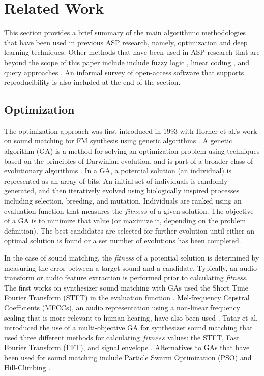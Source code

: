 \section{Related Work}\label{sec:2}
This section provides a brief summary of the main algorithmic methodologies that have been used in previous ASP research, namely, optimization and deep learning techniques. Other methods that have been used in ASP research that are beyond the scope of this paper include  include fuzzy logic \cite{mitchell2005frequency, hamadicharef2012intelligent}, linear coding \cite{mintz2007toward}, and query approaches \cite{mcartwright2014}. An  informal survey of open-access software that supports reproducibility is also included at the end of the section.

\subsection{Optimization}
The optimization approach was first introduced in 1993 with Horner et al.'s work on sound matching for FM synthesis using genetic algorithms \cite{horner1993machine}. A genetic algorithm (GA) is a method for solving an optimization problem using techniques based on the principles of Darwinian evolution, and is part of a broader class of evolutionary algorithms \cite{whitley1994genetic}. In a GA, a potential solution (an individual) is represented as an array of bits. An initial set of individuals is randomly generated, and then iteratively evolved using biologically inspired processes including selection, breeding, and mutation. Individuals are ranked using an evaluation function that measures the $fitness$ of a given solution. The objective of a GA is to minimize that value (or maximize it, depending on the problem definition). The best candidates are selected for further evolution until either an optimal solution is found or a set number of evolutions has been completed.

In the case of sound matching, the \textit{fitness} of a potential solution is determined by measuring the error between a target sound and a candidate. Typically, an audio transform or audio feature extraction is performed prior to calculating \textit{fitness}. The first works on synthesizer sound matching with GAs used the Short Time Fourier Transform (STFT) in the evaluation function \cite{horner1993machine, horner1995wavetable}. Mel-frequency Cepstral Coefficients (MFCCs), an audio representation using a non-linear frequency scaling that is more relevant to human hearing, have also been used \cite{yee2008synthbot, roth2011comparison, macret2014automatic, smith2017play}. Tatar et al. introduced the use of a multi-objective GA for synthesizer sound matching that used three different methods for calculating $fitness$ values: the STFT, Fast Fourier Transform (FFT), and signal envelope \cite{tatar2016automatic}. Alternatives to GAs that have been used for sound matching include Particle Swarm Optimization (PSO) \cite{heise2009automatic} and Hill-Climbing \cite{roth2011comparison, luke2019stochastic}.

